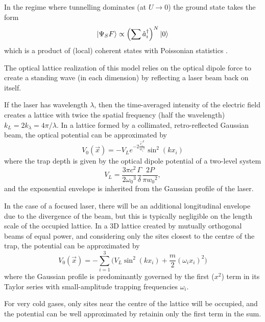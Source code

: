 	In the regime where tunnelling dominates (at $U\rightarrow 0$) the ground state takes the form
	\begin{equation}
		|\Psi_SF\rangle \propto \left(\sum \hat{a}^\dagger_i\right)^N|0\rangle
	\end{equation}
	which is a product of (local) coherent states with Poissonian statistics \cite{Greiner02}.

	
	The optical lattice realization of this model relies on the optical dipole force \cite{Grimm00} to create a standing wave (in each dimension) by reflecting a laser beam back on itself.
	
	If the laser has wavelength $\lambda$, then the time-averaged intensity of the electric field creates a lattice with twice the spatial frequency (half the wavelength) $k_L = 2k_\lambda = 4\pi/\lambda$.
	In a lattice formed by a collimated, retro-reflected Gaussian beam, the optical potential can be approximated by
	\begin{equation}
		V_0(\vec{x}) = - V_{L} e^{-2\frac{{\vec{r_i}}^2}{{w_i}^2}} \sin^2(k x_i)
	\end{equation}
	where the trap depth is given by the optical dipole potential of a two-level system \cite{Grimm00}
	\begin{equation}
		V_{L} = \frac{3\pi c^2}{2{\omega_0}^3}\frac{\Gamma}{\delta}\frac{2P}{\pi {w_0}^2},
	\end{equation}
	and the exponential envelope is inherited from the Gaussian profile of the laser.
	
	In the case of a focused laser, there will be an additional longitudinal envelope due to the divergence of the beam, but this is typically negligible on the length scale of the occupied lattice.
	In a 3D lattice created by mutually orthogonal beams of equal power, and considering only the sites closest to the centre of the trap, the potential can be approximated by 
	\begin{equation}
		V_0(\vec{x}) = -\sum_{i=1}^3\Big( V_{L} \sin^2(k x_i) + \frac{m}{2}(\omega_i x_i)^2\Big)
	\end{equation}
	where the Gaussian profile is predominantly governed by the first ($x^2$) term in its Taylor series with small-amplitude trapping frequencies $\omega_i$.
	
	For very cold gases, only sites near the centre of the lattice will be occupied, and the potential can be well approximated by retainin only the first term in the sum.
	
